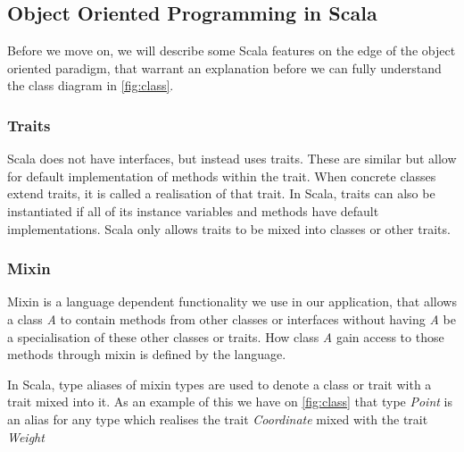 \subsection{Object Oriented Programming in Scala}
Before we move on, we will describe some Scala features on the edge of the object oriented paradigm, that warrant an explanation before we can fully understand the class diagram in \cref{fig:class}.

\subsubsection{Traits}
Scala does not have interfaces, but instead uses traits. These are similar but allow for default implementation of methods within the trait. When concrete classes extend traits, it is called a realisation of that trait. In Scala, traits can also be instantiated if all of its instance variables and methods have default implementations. Scala only allows traits to be mixed into classes or other traits.

\subsubsection{Mixin}
Mixin is a language dependent functionality we use in our application, that allows a class \emph{A} to contain methods from other classes or interfaces without having \emph{A} be a specialisation of these other classes or traits. How class \emph{A} gain access to those methods through mixin is defined by the language. 

In Scala, type aliases of mixin types are used to denote a class or trait with a trait mixed into it. As an example of this we have on \cref{fig:class} that type \emph{Point} is an alias for any type which realises the trait \emph{Coordinate} mixed with the trait \emph{Weight}
